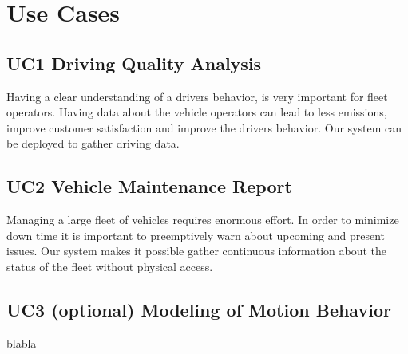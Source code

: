\newpage
\section{Use Cases}
\label{sec:use_cases}
\subsection{UC1 Driving Quality Analysis}
Having a clear understanding of a drivers behavior, is very important for fleet operators. Having data about the vehicle operators can lead to less emissions, improve customer satisfaction and improve the drivers behavior. Our system can be deployed to gather driving data.  

\subsection{UC2 Vehicle Maintenance Report}
Managing a large fleet of vehicles requires enormous effort. In order to minimize down time it is important to preemptively warn about upcoming and present issues. Our system makes it possible gather continuous information about the status of the fleet without physical access. 

\subsection{UC3 (optional) Modeling of Motion Behavior}
blabla